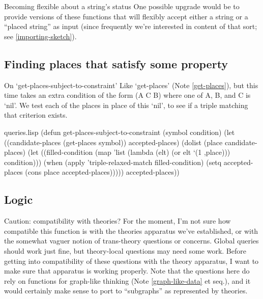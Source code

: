 \begin{notate}{Becoming flexible about a string's status}
One possible upgrade would be to provide versions of these
functions that will flexibly accept either a string or a
``placed string'' as input (since frequently we're
interested in content of that sort; see
\ref{importing-sketch}).
\end{notate}

\subsection*{Finding places that satisfy some property}

\begin{notate}{On `get-places-subject-to-constraint'}
Like `get-places' (Note \ref{get-places}), but this
time takes an extra condition of the form (A C B)
where one of A, B, and C is `nil'.  We test each
of the places in place of this `nil', to see if a
triple matching that criterion exists.
\end{notate}

\begin{common}{queries.lisp}
(defun get-places-subject-to-constraint (symbol condition)
  (let ((candidate-places (get-places symbol))
        accepted-places)
    (dolist (place candidate-places)
      (let ((filled-condition
             (map 'list (lambda (elt) (or elt
                                          `(1 ,place)))
                  condition)))
        (when (apply 'triple-relaxed-match
                     filled-condition)
          (setq accepted-places
                (cons place accepted-places)))))
    accepted-places))
\end{common}

\subsection*{Logic}

\begin{notate}{Caution: compatibility with theories?}
For the moment, I'm not sure how compatible this function
is with the theories apparatus we've established, or with
the somewhat vaguer notion of trans-theory questions or
concerns.  Global queries should work just fine, but
theory-local questions may need some work.  Before getting
into compatibility of these questions with the theory
apparatus, I want to make sure that apparatus is working
properly.  Note that the questions here do rely on
functions for graph-like thinking (Note
\ref{graph-like-data} et seq.), and it would certainly
make sense to port to ``subgraphs'' as represented by
theories.
\end{notate}


